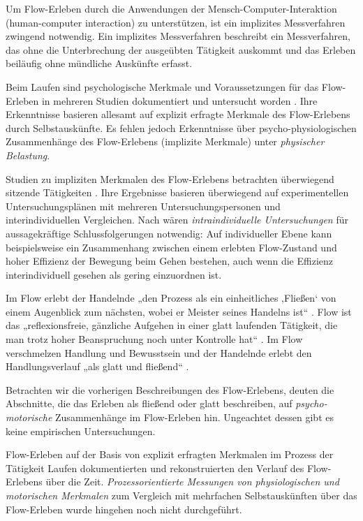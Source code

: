 \label{sec:gegenstand_problemstellung_und_ziele}

Um Flow-Erleben durch die Anwendungen der Mensch-Computer-Interaktion (human-computer interaction) zu unterstützen, ist ein implizites Messverfahren zwingend notwendig. Ein implizites Messverfahren beschreibt ein Messverfahren, das ohne die Unterbrechung der ausgeübten Tätigkeit auskommt und das Erleben beiläufig ohne mündliche Auskünfte erfasst.

Beim Laufen sind psychologische Merkmale und Voraussetzungen für das Flow-Erleben in mehreren Studien dokumentiert und untersucht worden \citep{Stoll2005, Reinhardt2006, Schuler2009, Jimenez-Torres2013}. Ihre Erkenntnisse basieren allesamt auf explizit erfragte Merkmale des Flow-Erlebens durch Selbstauskünfte. Es fehlen jedoch Erkenntnisse über psycho-physiologischen Zusammenhänge des Flow-Erlebens (implizite Merkmale) unter \emph{physischer Belastung}. 

Studien zu impliziten Merkmalen des Flow-Erlebens betrachten überwiegend sitzende Tätigkeiten \citep{deManzano2010, Keller2011, Peifer2014, Tozman2015, Harmat2015}. Ihre Ergebnisse basieren überwiegend auf experimentellen Untersuchungsplänen mit mehreren Untersuchungspersonen und interindividuellen Vergleichen. Nach \citet[][S.77]{Henk2014} wären \emph{intraindividuelle Untersuchungen} für aussagekräftige Schlussfolgerungen notwendig: Auf individueller Ebene kann beispielsweise ein Zusammenhang zwischen einem erlebten Flow-Zustand und hoher Effizienz der Bewegung beim Gehen bestehen, auch wenn die Effizienz interindividuell gesehen als gering einzuordnen ist.

Im Flow erlebt der Handelnde „den Prozess als ein einheitliches ‚Fließen‘ von einem Augenblick zum nächsten, wobei er Meister seines Handelns ist“ \citep[][S.~59]{Csikszentmihalyi2010}. Flow ist das „reflexionsfreie, gänzliche Aufgehen in einer glatt laufenden Tätigkeit, die man trotz hoher Beanspruchung noch unter Kontrolle hat“ \citep[][S.~156]{Rheinberg2003}. Im Flow verschmelzen Handlung und Bewusstsein und der Handelnde erlebt den Handlungsverlauf „als glatt und fließend“ \citep[][S.~13]{Henk2014}.

Betrachten wir die vorherigen Beschreibungen des Flow-Erlebens, deuten die Abschnitte, die das Erleben als fließend oder glatt beschreiben, auf \emph{psycho-motorische} Zusammenhänge im Flow-Erleben hin. Ungeachtet dessen gibt es keine empirischen Untersuchungen.

Flow-Erleben auf der Basis von explizit erfragten Merkmalen im Prozess der Tätigkeit Laufen dokumentierten \citet{Reinhardt2006, Schuler2009} und rekonstruierten den Verlauf des Flow-Erlebens über die Zeit. \emph{Prozessorientierte Messungen von physiologischen und motorischen Merkmalen} zum Vergleich mit mehrfachen Selbstauskünften über das Flow-Erleben wurde hingehen noch nicht durchgeführt.

